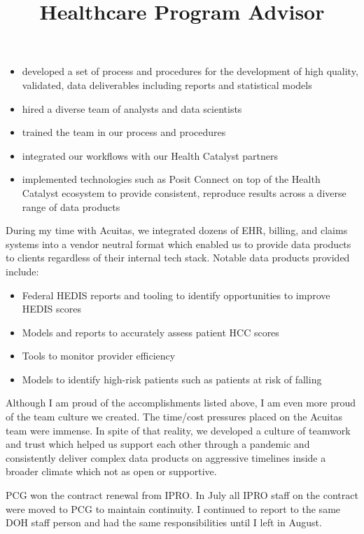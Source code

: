 \documentclass[line, mm, 10pt]{res}
\begin{document}
\begin{resume}
\begin{position}
    \begin{itemize}
      \item developed a set of process and procedures for the development of
      high quality, validated, data deliverables including reports and
      statistical models
      \item hired a diverse team of analysts and data scientists
      \item trained the team in our process and procedures
      \item integrated our workflows with our Health Catalyst partners
      \item implemented technologies such as Posit Connect on top of the Health
      Catalyst ecosystem to provide consistent, reproduce results across a
      diverse range of data products
    \end{itemize}

    During my time with Acuitas, we integrated dozens of EHR, billing, and
    claims systems into a vendor neutral format which enabled us to provide data
    products to clients regardless of their internal tech stack. Notable data
    products provided include:

    \begin{itemize}
      \item Federal HEDIS reports and tooling to identify opportunities to
      improve HEDIS scores
      \item Models and reports to accurately assess patient HCC scores
      \item Tools to monitor provider efficiency
      \item Models to identify high-risk patients such as patients at risk of
      falling
    \end{itemize}
  
    Although I am proud of the accomplishments listed above, I am even more
    proud of the team culture we created. The time/cost pressures placed on the
    Acuitas team were immense. In spite of that reality, we developed a culture
    of teamwork and trust which helped us support each other through a pandemic
    and consistently deliver complex data products on aggressive timelines
    inside a broader climate which not as open or supportive.
  \end{position}

  \title{Healthcare Program Advisor}
  \begin{position}
    PCG won the contract renewal from IPRO. In July all IPRO staff on the
    contract were moved to PCG to maintain continuity. I continued to report to
    the same DOH staff person and had the same responsibilities until I left in
    August.
  \end{position}


\end{resume}
\end{document}
